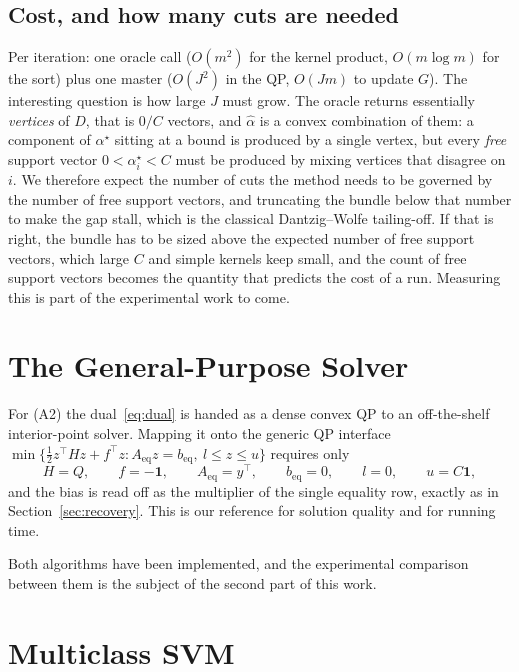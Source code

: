 \documentclass[11pt,a4paper]{report}
\newcommand{\one}{\mathbf{1}}
\begin{document}
\section{Cost, and how many cuts are needed}
\label{sec:cost}
Per iteration: one oracle call ($O(m^2)$ for the kernel product, $O(m\log m)$ for the
sort) plus one master ($O(J^2)$ in the QP, $O(Jm)$ to update $G$). The interesting
question is how large $J$ must grow. The oracle returns essentially \emph{vertices}
of $D$, that is $0/C$ vectors, and $\hat\alpha$ is a convex combination of them: a
component of $\alpha^\star$ sitting at a bound is produced by a single vertex, but
every \emph{free} support vector $0<\alpha^\star_i<C$ must be produced by mixing
vertices that disagree on $i$. We therefore expect the number of cuts the method needs to be governed by the number
of free support vectors, and truncating the bundle below that number to make the gap
stall, which is the classical Dantzig--Wolfe tailing-off. If that is right, the
bundle has to be sized above the expected number of free support vectors, which
large $C$ and simple kernels keep small, and the count of free support vectors
becomes the quantity that predicts the cost of a run. Measuring this is part of the
experimental work to come.

\chapter{The General-Purpose Solver}
\label{ch:a2}

For (A2) the dual~\eqref{eq:dual} is handed as a dense convex QP to an off-the-shelf
interior-point solver. Mapping it onto the generic QP interface
$\min\{\tfrac12 z^{\!\top}Hz+f^{\!\top}z: A_{\mathrm{eq}}z=b_{\mathrm{eq}},\ l\le z\le u\}$
requires only
\[
H=Q,\qquad f=-\one,\qquad A_{\mathrm{eq}}=y^{\!\top},\qquad b_{\mathrm{eq}}=0,
\qquad l=0,\qquad u=C\one ,
\]
and the bias is read off as the multiplier of the single equality row, exactly as in
Section~\ref{sec:recovery}. This is our reference for solution quality and for
running time.

Both algorithms have been implemented, and the experimental comparison between them
is the subject of the second part of this work.

\chapter{Multiclass SVM}
\label{ch:multiclass}
\end{document}
